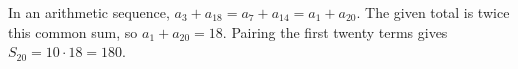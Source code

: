 In an arithmetic sequence, $a_3+a_{18}=a_7+a_{14}=a_1+a_{20}$. The given total is twice this common sum, so $a_1+a_{20}=18$. Pairing the first twenty terms gives $S_{20}=10\cdot18=\boxed{180}$.

